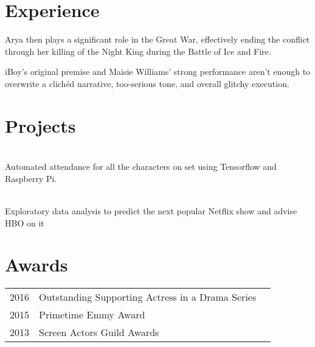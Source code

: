\documentclass[]{ds-resume}
\begin{document}
\begin{minipage}[t]{0.66\textwidth} 


\section{Experience}

\vspace{\topsep} %
\begin{tightemize}\item Arya then plays a significant role in the Great War, effectively ending the conflict through her killing of the Night King during the Battle of Ice and Fire.
\end{tightemize}
\sectionsep

\begin{tightemize}
\item iBoy's original premise and Maisie Williams' strong performance aren't enough to overwrite a clichéd narrative, too-serious tone, and overall glitchy execution.
\end{tightemize}
\sectionsep


\section{Projects}
 \\
\sectionsep
Automated attendance for all the characters on set using Tensorflow and Raspberry Pi.
\sectionsep

 \\
\sectionsep
Exploratory data analysis to predict the next popular Netflix show and advise HBO on it
\sectionsep



\section{Awards} 
\begin{tabular}{rll}
2016	     & Outstanding Supporting Actress in a Drama Series\\
2015 	 & Primetime Emmy Award \\
2013	     & Screen Actors Guild Awards\\
\end{tabular}
\sectionsep


\end{minipage}
\end{document}
